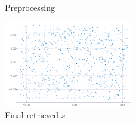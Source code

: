 \documentclass[11pt]{article}
\begin{document}
\begin{figure}[H]
  \centering
  \hfill
  \caption{Preprocessing}
\end{figure}

\begin{figure}[H]
 	\centering
	\includegraphics[width=0.5\textwidth]{s_retrieved.png}
 	\caption{Final retrieved $s$}
\end{figure}

\printbibliography
\end{document}
